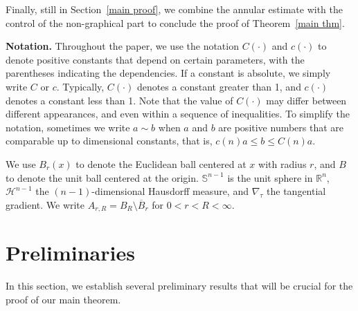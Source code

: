 \documentclass[reqno,11pt]{amsart}
\newcommand{\R}{\mathbb R}
\numberwithin{equation}{section}
\theoremstyle{remark}
\begin{document}
Finally, still in Section~\ref{main proof}, we combine the annular estimate with the control of the non-graphical part to conclude the proof of Theorem~\ref{main thm}.



\medskip
{\noindent \bf Notation.} Throughout the paper, we use the notation $C(\cdot)$ and $c(\cdot)$ to denote positive constants that depend on certain parameters, with the parentheses indicating the dependencies. If a constant is absolute, we simply write $C$ or $c$. Typically, $C(\cdot)$ denotes a constant greater than 1, and $c(\cdot)$ denotes a constant less than 1.
Note that the value of $C(\cdot)$ may differ between different appearances, and even within a sequence of inequalities.
To simplify the notation, sometimes we write $a\sim b$ when $a$ and $b$ are positive numbers that are comparable up to dimensional constants, that is, $c(n)a\leq b \leq C(n)a$.

We use $B_r(x)$ to denote the Euclidean ball centered at $x$ with radius $r$, and $B$ to denote the unit ball centered at the origin. $\mathbb S^{n-1}$ is the unit sphere in $\R^n$, $\mathscr H^{n-1}$ the $(n-1)$-dimensional Hausdorff measure, and $\nabla_\tau$ the tangential gradient. We write $A_{r,R}=B_R\setminus \overline{B}_r$ for $0<r<R<\infty. $


\section{Preliminaries}\label{sec:preliminaries}

In this section, we establish several preliminary results that will be crucial for the proof of our main theorem. 
\end{document}

